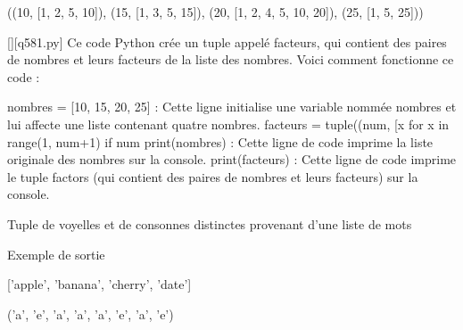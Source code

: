 ((10, [1, 2, 5, 10]), (15, [1, 3, 5, 15]), (20, [1, 2, 4, 5, 10, 20]), (25, [1, 5, 25]))
        \par
        \begin{solution}
            \renewcommand{\nomfichier}{q581.py}
            \pythonfile{\chemincode \nomfichier}[][\nomfichier]
            Ce code Python crée un tuple appelé facteurs, qui contient des paires de nombres et leurs facteurs de la liste des nombres. Voici comment fonctionne ce code :

    nombres = [10, 15, 20, 25] : Cette ligne initialise une variable nommée nombres et lui affecte une liste contenant quatre nombres.
    facteurs = tuple((num, [x for x in range(1, num+1) if num %
    print(nombres) : Cette ligne de code imprime la liste originale des nombres sur la console.
    print(facteurs) : Cette ligne de code imprime le tuple factors (qui contient des paires de nombres et leurs facteurs) sur la console.
        \end{solution}
        

        \question
        Tuple de voyelles et de consonnes distinctes provenant d'une liste de mots

Exemple de sortie

['apple', 'banana', 'cherry', 'date']

('a', 'e', 'a', 'a', 'a', 'e', 'a', 'e')

